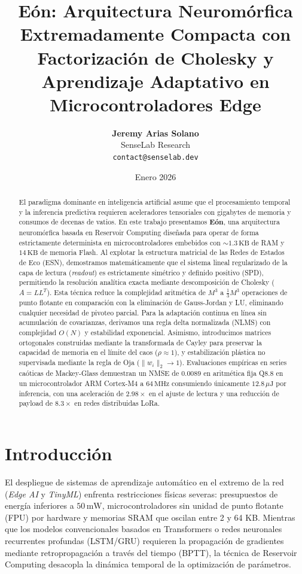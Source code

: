 \documentclass[10pt,twocolumn]{article}
\title{\textbf{Eón: Arquitectura Neuromórfica Extremadamente Compacta con Factorización de Cholesky y Aprendizaje Adaptativo en Microcontroladores Edge}}
\author{
  \textbf{Jeremy Arias Solano} \\
  SenseLab Research \\
  \texttt{contact@senselab.dev}
}
\date{Enero 2026}
\begin{document}
\maketitle

\begin{abstract}
El paradigma dominante en inteligencia artificial asume que el procesamiento temporal y la inferencia predictiva requieren aceleradores tensoriales con gigabytes de memoria y consumos de decenas de vatios. En este trabajo presentamos \textbf{Eón}, una arquitectura neuromórfica basada en Reservoir Computing diseñada para operar de forma estrictamente determinista en microcontroladores embebidos con $\sim 1.3\,\text{KB}$ de RAM y $14\,\text{KB}$ de memoria Flash. Al explotar la estructura matricial de las Redes de Estados de Eco (ESN), demostramos matemáticamente que el sistema lineal regularizado de la capa de lectura (\textit{readout}) es estrictamente simétrico y definido positivo (SPD), permitiendo la resolución analítica exacta mediante descomposición de Cholesky ($A = L L^T$). Esta técnica reduce la complejidad aritmética de $M^3$ a $\frac{1}{3} M^3$ operaciones de punto flotante en comparación con la eliminación de Gauss-Jordan y LU, eliminando cualquier necesidad de pivoteo parcial. Para la adaptación continua en línea sin acumulación de covarianzas, derivamos una regla delta normalizada (NLMS) con complejidad $O(N)$ y estabilidad exponencial. Asimismo, introducimos matrices ortogonales construidas mediante la transformada de Cayley para preservar la capacidad de memoria en el límite del caos ($\rho \approx 1$), y estabilización plástica no supervisada mediante la regla de Oja ($\|w_i\|_2 \to 1$). Evaluaciones empíricas en series caóticas de Mackey-Glass demuestran un NMSE de $0.0089$ en aritmética fija Q8.8 en un microcontrolador ARM Cortex-M4 a $64\,\text{MHz}$ consumiendo únicamente $12.8\,\mu\text{J}$ por inferencia, con una aceleración de $2.98\times$ en el ajuste de lectura y una reducción de payload de $8.3\times$ en redes distribuidas LoRa.
\end{abstract}

\section{Introducción}

El despliegue de sistemas de aprendizaje automático en el extremo de la red (\textit{Edge AI} y \textit{TinyML}) enfrenta restricciones físicas severas: presupuestos de energía inferiores a $50\,\text{mW}$, microcontroladores sin unidad de punto flotante (FPU) por hardware y memorias SRAM que oscilan entre 2 y 64 KB. Mientras que los modelos convencionales basados en Transformers o redes neuronales recurrentes profundas (LSTM/GRU) requieren la propagación de gradientes mediante retropropagación a través del tiempo (BPTT), la técnica de Reservoir Computing desacopla la dinámica temporal de la optimización de parámetros.
\end{document}
